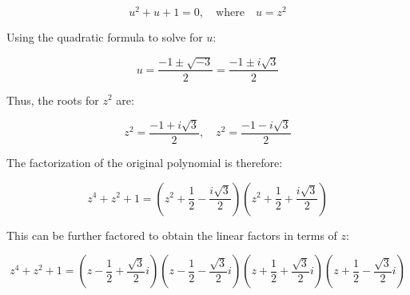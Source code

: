 \documentclass[
	12pt, %
	fleqn, %
	a4paper, %
]{LegrandOrangeBook}
\begin{document}
\[
u^2 + u + 1 = 0, \quad \text{where} \quad u = z^2
\]

Using the quadratic formula to solve for \( u \):

\[
u = \frac{-1 \pm \sqrt{-3}}{2} = \frac{-1 \pm i\sqrt{3}}{2}
\]

Thus, the roots for \( z^2 \) are:

\[
z^2 = \frac{-1 + i\sqrt{3}}{2}, \quad z^2 = \frac{-1 - i\sqrt{3}}{2}
\]

The factorization of the original polynomial is therefore:

\[
z^4 + z^2 + 1 = \left(z^2 + \frac{1}{2} - \frac{i\sqrt{3}}{2}\right)\left(z^2 + \frac{1}{2} + \frac{i\sqrt{3}}{2}\right)
\]

This can be further factored to obtain the linear factors in terms of \( z \):

\[
z^4 + z^2 + 1 = \left(z - \frac{1}{2} + \frac{\sqrt{3}}{2}i\right)\left(z - \frac{1}{2} - \frac{\sqrt{3}}{2}i\right)\left(z + \frac{1}{2} + \frac{\sqrt{3}}{2}i\right)\left(z + \frac{1}{2} - \frac{\sqrt{3}}{2}i\right)
\]
\end{document}
